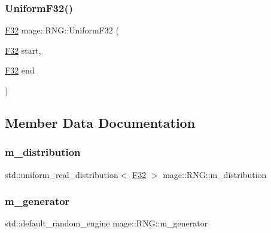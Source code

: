 \mbox{\label{classmage_1_1_r_n_g_a16e2f397e2473e790877ccaf6e249612}} 
\subsubsection{\texorpdfstring{Uniform\+F32()}{UniformF32()}\hspace{0.1cm}{\footnotesize\ttfamily [2/2]}}
{\footnotesize\ttfamily \mbox{\hyperlink{namespacemage_aa97e833b45f06d60a0a9c4fc22ae02c0}{F32}} mage\+::\+R\+N\+G\+::\+Uniform\+F32 (\begin{DoxyParamCaption}\item[{\mbox{\hyperlink{namespacemage_aa97e833b45f06d60a0a9c4fc22ae02c0}{F32}}}]{start,  }\item[{\mbox{\hyperlink{namespacemage_aa97e833b45f06d60a0a9c4fc22ae02c0}{F32}}}]{end }\end{DoxyParamCaption})\hspace{0.3cm}{\ttfamily [noexcept]}}



\subsection{Member Data Documentation}
\mbox{\label{classmage_1_1_r_n_g_ac94e7e49a1751dfbfa590cd6da68b032}} 
\subsubsection{\texorpdfstring{m\+\_\+distribution}{m\_distribution}}
{\footnotesize\ttfamily std\+::uniform\+\_\+real\+\_\+distribution$<$ \mbox{\hyperlink{namespacemage_aa97e833b45f06d60a0a9c4fc22ae02c0}{F32}} $>$ mage\+::\+R\+N\+G\+::m\+\_\+distribution\hspace{0.3cm}{\ttfamily [private]}}

\mbox{\label{classmage_1_1_r_n_g_a43dc452c2e32d468fa42d16e02d3a283}} 
\subsubsection{\texorpdfstring{m\+\_\+generator}{m\_generator}}
{\footnotesize\ttfamily std\+::default\+\_\+random\+\_\+engine mage\+::\+R\+N\+G\+::m\+\_\+generator\hspace{0.3cm}{\ttfamily [private]}}


